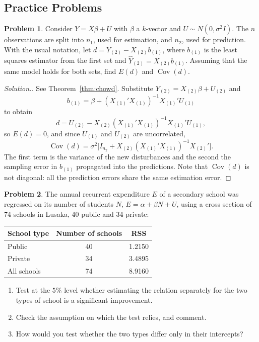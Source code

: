 \documentclass[11pt,a4paper]{article}
\numberwithin{equation}{section}
\DeclareMathOperator{\Cov}{Cov}
\theoremstyle{definition}
\newtheorem{problemx}{Problem}[subsection]
\newenvironment{problem}{\begin{problemx}}{\end{problemx}}
\newenvironment{solution}
  {\renewcommand{\qedsymbol}{}\begin{proof}[\textit{Solution}.]}
  {\end{proof}}
\begin{document}
\subsection{Practice Problems}

\begin{problem}
Consider $Y = X\beta + U$ with $\beta$ a $k$-vector and $U \sim N(0, \sigma^2I)$. The $n$ observations are split into $n_1$, used for estimation, and $n_2$, used for
prediction. With the usual notation, let $d = Y_{(2)} - X_{(2)}b_{(1)}$, where $b_{(1)}$ is the least squares estimator from the first set and
$\hat Y_{(2)} = X_{(2)}b_{(1)}$. Assuming that the same model holds for both sets, find $E(d)$ and $\Cov(d)$.
\end{problem}

\begin{solution}
See Theorem~\ref{thm:chowd}. Substitute $Y_{(2)} = X_{(2)}\beta + U_{(2)}$ and
\[
b_{(1)} = \beta + (X_{(1)}'X_{(1)})^{-1}X_{(1)}'U_{(1)}
\]
to obtain
\[
d = U_{(2)} - X_{(2)}(X_{(1)}'X_{(1)})^{-1}X_{(1)}'U_{(1)} ,
\]
so $E(d) = 0$, and since $U_{(1)}$ and $U_{(2)}$ are uncorrelated,
\[
\Cov(d) = \sigma^2\bigl[I_{n_2} + X_{(2)}(X_{(1)}'X_{(1)})^{-1}X_{(2)}'\bigr] .
\]
The first term is the variance of the new disturbances and the second the sampling error in $b_{(1)}$ propagated into the predictions. Note that $\Cov(d)$
is not diagonal: all the prediction errors share the same estimation error.
\end{solution}

\begin{problem}
The annual recurrent expenditure $E$ of a secondary school was regressed on its number of students $N$, $E = \alpha + \beta N + U$, using a cross section
of 74 schools in Lusaka, 40 public and 34 private:
\begin{center}
\begin{tabular}{lcc}
School type & Number of schools & RSS\\\hline
Public & 40 & 1.2150\\
Private & 34 & 3.4895\\
All schools & 74 & 8.9160
\end{tabular}
\end{center}
\begin{enumerate}[label=(\alph*)]
\item Test at the $5\%$ level whether estimating the relation separately for the two types of school is a significant improvement.
\item Check the assumption on which the test relies, and comment.
\item How would you test whether the two types differ only in their intercepts?
\end{enumerate}
\end{problem}
\end{document}
